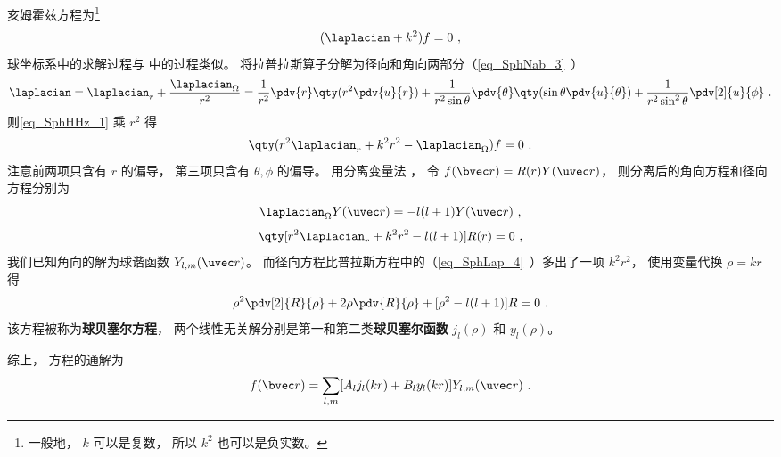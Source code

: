 

亥姆霍兹方程为\footnote{一般地， $k$ 可以是复数， 所以 $k^2$ 也可以是负实数。}
\begin{equation}\label{eq_SphHHz_1}
(\laplacian + k^2)f = 0~,
\end{equation}
球坐标系中的求解过程与 中的过程类似。 将拉普拉斯算子分解为径向和角向两部分（\autoref{eq_SphNab_3}~）
\begin{equation}
\laplacian = \laplacian_r + \frac{\laplacian_{\Omega}}{r^2} = \frac{1}{r^2} \pdv{r} \qty(r^2 \pdv{u}{r}) + \frac{1}{r^2\sin\theta}\pdv{\theta} \qty(\sin \theta \pdv{u}{\theta}) + \frac{1}{r^2\sin^2 \theta} \pdv[2]{u}{\phi}~.
\end{equation}
则\autoref{eq_SphHHz_1} 乘 $r^2$ 得
\begin{equation}
\qty(r^2\laplacian_r + k^2 r^2 - \laplacian_\Omega) f = 0~.
\end{equation}
注意前两项只含有 $r$ 的偏导， 第三项只含有 $\theta,\phi$ 的偏导。 用分离变量法 %
， 令 $f(\bvec r) = R(r) Y(\uvec r)$， 则分离后的角向方程和径向方程分别为
\begin{equation}
\laplacian_{\Omega} Y(\uvec r) = -l(l+1) Y(\uvec r)~,
\end{equation}
\begin{equation}
\qty[r^2\laplacian_r + k^2 r^2 - l(l+1)] R(r) = 0~,
\end{equation}
我们已知角向的解为球谐函数 $Y_{l,m}(\uvec r)$。 而径向方程比普拉斯方程中的（\autoref{eq_SphLap_4}~）多出了一项 $k^2r^2$， 使用变量代换 $\rho = kr$ 得
\begin{equation}
\rho^2\pdv[2]{R}{\rho} + 2\rho\pdv{R}{\rho} + [\rho^2 - l(l+1)] R = 0~.
\end{equation}
该方程被称为\textbf{球贝塞尔方程}， 两个线性无关解分别是第一和第二类\textbf{球贝塞尔函数} $j_l(\rho)$ 和 $y_l(\rho)$。

综上， 方程的通解为
\begin{equation}
f(\bvec r) = \sum_{l,m} [A_l j_l(kr) + B_l y_l(kr)] Y_{l,m}(\uvec r)~.
\end{equation}
